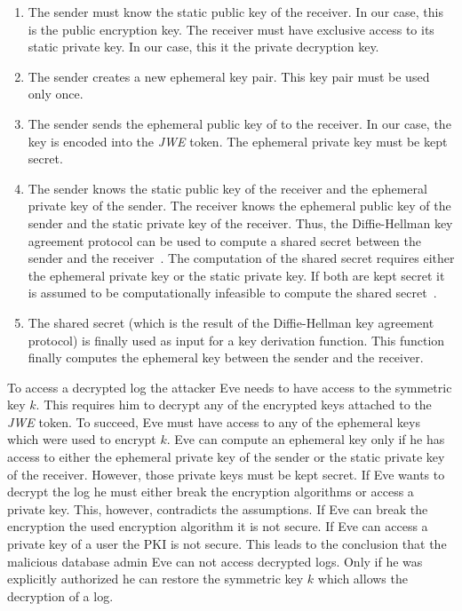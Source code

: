 \documentclass[../main.tex]{subfiles}
\begin{document}
\begin{enumerate}
    \item 
    The sender must know the static public key of the receiver. 
    In our case, this is the public encryption key.
    The receiver must have exclusive access to its static private key.
    In our case, this it the private decryption key.
    \item 
    The sender creates a new ephemeral key pair. 
    This key pair must be used only once.
    \item 
    The sender sends the ephemeral public key of to the receiver.
    In our case, the key is encoded into the \emph{JWE} token.
    The ephemeral private key must be kept secret.
    \item 
    The sender knows the static public key of the receiver and the ephemeral private key of the sender.
    The receiver knows the ephemeral public key of the sender and the static private key of the receiver.
    Thus, the Diffie-Hellman key agreement protocol can be used to compute a shared secret between the sender and the receiver~\cite[section 9.3.6]{Eckert2018}.
    The computation of the shared secret requires either the ephemeral private key or the static private key.
    If both are kept secret it is assumed to be computationally infeasible to compute the shared secret~\cite[section 9.3.6]{Eckert2018}.
    \item 
    The shared secret (which is the result of the Diffie-Hellman key agreement protocol) is finally used as input for a key derivation function.
    This function finally computes the ephemeral key between the sender and the receiver.
\end{enumerate}

To access a decrypted log the attacker Eve needs to have access to the symmetric key $k$.
This requires him to decrypt any of the encrypted keys attached to the \emph{JWE} token.
To succeed, Eve must have access to any of the ephemeral keys which were used to encrypt $k$.
Eve can compute an ephemeral key only if he has access to either the ephemeral private key of the sender or the static private key of the receiver.
However, those private keys must be kept secret.
If Eve wants to decrypt the log he must either break the encryption algorithms or access a private key.
This, however, contradicts the assumptions.
If Eve can break the encryption the used encryption algorithm it is not secure.
If Eve can access a private key of a user the PKI is not secure.
This leads to the conclusion that the malicious database admin Eve can not access decrypted logs.
Only if he was explicitly authorized he can restore the symmetric key $k$ which allows the decryption of a log.
\end{document}
